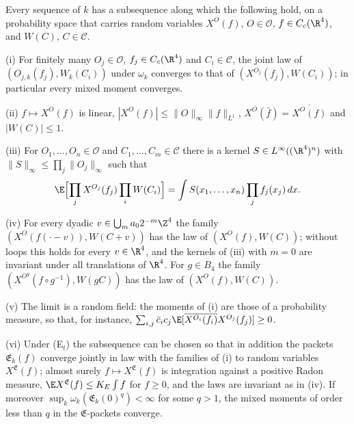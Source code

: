 \begin{theorem}\label{rF13:tight}
Every sequence of $k$ has a subsequence along which the following hold, on
a probability space that carries random variables $X^O(f)$, $O\in\mathcal
O$, $f\in C_c(\R^4)$, and $W(C)$, $C\in\mathcal C$.

\textup{(i)} For finitely many $O_j\in\mathcal O$, $f_j\in C_c(\R^4)$ and
$C_i\in\mathcal C$, the joint law of $(O_{j,k}(f_j),W_k(C_i))$ under
$\omega_k$ converges to that of $(X^{O_j}(f_j),W(C_i))$; in particular every
mixed moment converges.

\textup{(ii)} $f\mapsto X^O(f)$ is linear, $|X^O(f)|\le\|O\|_\infty\|f\|_{L^1}$,
$X^{\bar O}(\bar f)=\overline{X^O(f)}$ and $|W(C)|\le1$.

\textup{(iii)} For $O_1,\dots,O_n\in\mathcal O$ and $C_1,\dots,C_m\in\mathcal
C$ there is a kernel $S\in L^\infty((\R^4)^n)$ with $\|S\|_\infty\le\prod_j
\|O_j\|_\infty$ such that
\[
\E\Bigl[\prod_jX^{O_j}(f_j)\prod_iW(C_i)\Bigr]=\int S(x_1,\dots,x_n)
\prod_jf_j(x_j)\,dx .
\]

\textup{(iv)} For every dyadic $v\in\bigcup_ma_02^{-m}\Z^4$ the family
$(X^O(f(\cdot-v)),W(C+v))$ has the law of $(X^O(f),W(C))$; without loops
this holds for every $v\in\R^4$, and the kernels of \textup{(iii)} with $m=0$
are invariant under all translations of $\R^4$. For $g\in B_4$ the family
$(X^{O^g}(f\circ g^{-1}),W(gC))$ has the law of $(X^O(f),W(C))$.

\textup{(v)} The limit is a random field: the moments of \textup{(i)} are
those of a probability measure, so that, for instance,
$\sum_{i,j}\bar c_ic_j\E[\overline{X^{O_i}(f_i)}X^{O_j}(f_j)]\ge0$.

\textup{(vi)} Under \textup{(E$_t$)} the subsequence can be chosen so that
in addition the packets $\mathfrak E_k(f)$ converge jointly in law with the
families of \textup{(i)} to random variables $X^{\mathfrak E}(f)$; almost
surely $f\mapsto X^{\mathfrak E}(f)$ is integration against a positive Radon
measure, $\E X^{\mathfrak E}(f)\le K_E\int f$ for $f\ge0$, and the laws are
invariant as in \textup{(iv)}. If moreover $\sup_k\omega_k(\mathfrak E_k(0)^q)
<\infty$ for some $q>1$, the mixed moments of order less than $q$ in the
$\mathfrak E$-packets converge.
\end{theorem}

